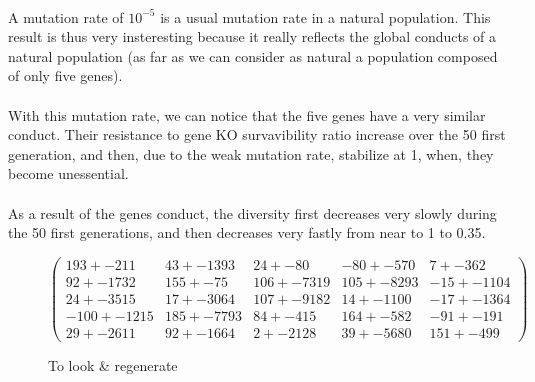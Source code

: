 \documentclass[]{report} %
\begin{document}
    \paragraph*{}
    A mutation rate of $10^{-5}$ is a usual mutation rate in a natural population. This result is thus very insteresting because it really reflects the global conducts of a natural population (as far as we can consider as natural a population composed of only five genes).
    \paragraph*{}
    With this mutation rate, we can notice that the five genes have a very similar conduct. Their resistance to gene KO survavibility ratio increase over the 50 first generation, and then, due to the weak mutation rate, stabilize at 1, when, they become unessential.
    \paragraph*{} 
    As a result of the genes conduct, the diversity first decreases very slowly during the 50 first generations, and then decreases very fastly from near to 1 to 0.35. 
   

    \begin{figure}[H] 
            \centering
            \small
    $
            \begin{pmatrix}
                  193 +- 211 & 43 +- 1393 & 24 +- 80 & -80 +- 570 & 7 +- 362 \\
                  92 +- 1732 & 155 +- 75 & 106 +- 7319 & 105 +- 8293 & -15 +- 1104 \\
                  24 +- 3515 & 17 +- 3064 & 107 +- 9182 & 14 +- 1100 & -17 +- 1364 \\
                  -100 +- 1215 & 185 +- 7793 & 84 +- 415 & 164 +- 582 & -91 +- 191 \\
                  29 +- 2611 & 92 +- 1664 & 2 +- 2128 & 39 +- 5680 & 151 +- 499 
            \end{pmatrix}
    $
            \caption{\footnotesize To look \& regenerate}
            \label{mat:ps300xg200xmr1-10-5}
    \end{figure}

    
\end{document}
